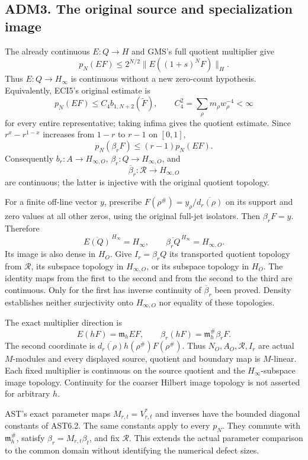 \subsection{ADM3. The original source and specialization
image}\label{adm3.-the-original-source-and-specialization-image}

The already continuous \(E:Q\to H\) and GMS's full quotient multiplier
give \[
p_N(EF)\le2^{N/2}\|E((1+s)^NF)\|_H.
\tag{ADM3.1}
\] Thus \(E:Q\to H_\infty\) is continuous without a new zero-count
hypothesis. Equivalently, ECI5's original estimate is \[
p_N(EF)\le C_4 b_{1,N+2}(\widetilde F),\qquad
C_4^2=\sum_\rho m_\rho w_\rho^{-4}<\infty
\tag{ADM3.2}
\] for every entire representative; taking infima gives the quotient
estimate. Since \(r^x-r^{1-x}\) increases from \(1-r\) to \(r-1\) on
\([0,1]\), \[
p_N(\beta_rF)\le(r-1)p_N(EF).
\tag{ADM3.3}
\] Consequently \(b_r:A\to H_{\infty,O}\),
\(\beta_r:Q\to H_{\infty,O}\), and \[
\overline\beta_r:\mathcal R\longrightarrow H_{\infty,O}
\tag{ADM3.4}
\] are continuous; the latter is injective with the original quotient
topology.

For a finite off-line vector \(y\), prescribe
\(F(\rho^\#)=y_\rho/\overline{d_r(\rho)}\) on its support and zero
values at all other zeros, using the original full-jet isolators. Then
\(\beta_rF=y\). Therefore \[
\overline{E(Q)}^{\,H_\infty}=H_\infty,\qquad
\overline{\beta_rQ}^{\,H_\infty}=H_{\infty,O}.
\tag{ADM3.5}
\] Its image is also dense in \(H_O\). Give \(I_r=\beta_rQ\) its
transported quotient topology from \(\mathcal R\), its subspace topology
in \(H_{\infty,O}\), or its subspace topology in \(H_O\). The identity
maps from the first to the second and from the second to the third are
continuous. Only for the first has inverse continuity of
\(\overline\beta_r\) been proved. Density establishes neither
surjectivity onto \(H_{\infty,O}\) nor equality of these topologies.

The exact multiplier direction is \[
E(hF)=\mathfrak m_hEF,\qquad
\beta_r(hF)=\mathfrak m_h^\#\beta_rF.
\tag{ADM3.6}
\] The second coordinate is
\(\overline{d_r(\rho)}h(\rho^\#)F(\rho^\#)\). Thus
\(N_O,A_O,\mathcal R,I_r\) are actual \(M\)-modules and every displayed
source, quotient and boundary map is \(M\)-linear. Each fixed multiplier
is continuous on the source quotient and the \(H_\infty\)-subspace image
topology. Continuity for the coarser Hilbert image topology is not
asserted for arbitrary \(h\).

AST's exact parameter maps \(M_{r,t}=V_{r,t}^*\) and inverses have the
bounded diagonal constants of AST6.2. The same constants apply to every
\(p_N\). They commute with \(\mathfrak m_h^\#\), satisfy
\(\beta_r=M_{r,t}\beta_t\), and fix \(\mathcal R\). This extends the
actual parameter comparison to the common domain without identifying the
numerical defect sizes.

